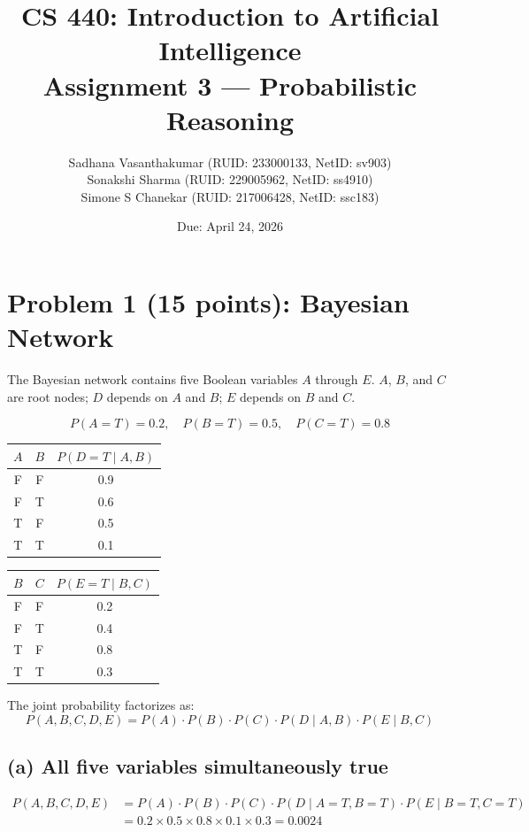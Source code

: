 \documentclass[12pt]{article}
\title{
    \textbf{CS 440: Introduction to Artificial Intelligence}\\
    \large Assignment 3 --- Probabilistic Reasoning
}
\author{
    Sadhana Vasanthakumar (RUID: 233000133, NetID: sv903)\\
    Sonakshi Sharma (RUID: 229005962, NetID: ss4910)\\
    Simone S Chanekar (RUID: 217006428, NetID: ssc183)
}
\date{Due: April 24, 2026}
\begin{document}
\maketitle
\tableofcontents
\newpage

\section{Problem 1 (15 points): Bayesian Network}

The Bayesian network contains five Boolean variables $A$ through $E$.
$A$, $B$, and $C$ are root nodes; $D$ depends on $A$ and $B$; $E$ depends on $B$ and $C$.

\[
P(A=T)=0.2,\quad P(B=T)=0.5,\quad P(C=T)=0.8
\]

\begin{center}
\begin{tabular}{ccc}
\toprule
$A$ & $B$ & $P(D=T \mid A,B)$\\
\midrule
F & F & 0.9\\
F & T & 0.6\\
T & F & 0.5\\
T & T & 0.1\\
\bottomrule
\end{tabular}
\qquad
\begin{tabular}{ccc}
\toprule
$B$ & $C$ & $P(E=T \mid B,C)$\\
\midrule
F & F & 0.2\\
F & T & 0.4\\
T & F & 0.8\\
T & T & 0.3\\
\bottomrule
\end{tabular}
\end{center}

The joint probability factorizes as:
\[
P(A,B,C,D,E)=P(A)\cdot P(B)\cdot P(C)\cdot P(D\mid A,B)\cdot P(E\mid B,C)
\]

\subsection*{(a) All five variables simultaneously true}

\begin{align*}
P(A,B,C,D,E)
  &= P(A)\cdot P(B)\cdot P(C)\cdot P(D\mid A{=}T,B{=}T)\cdot P(E\mid B{=}T,C{=}T)\\
  &= 0.2\times0.5\times0.8\times0.1\times0.3 = \boxed{0.0024}
\end{align*}
\end{document}
